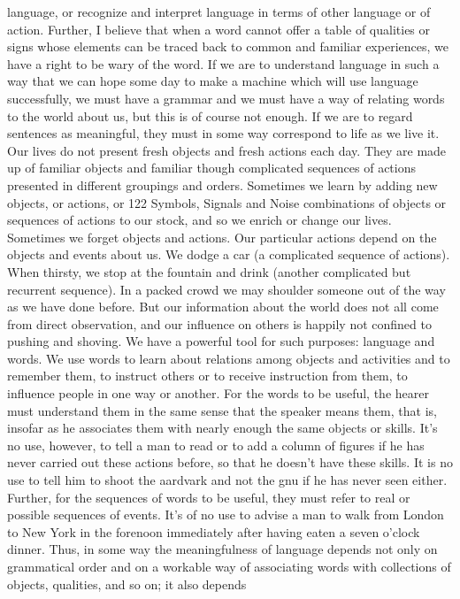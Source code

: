 {{{language, or recognize and interpret language in terms of other
language or of action. Further, I believe that when a word cannot
offer a table of qualities or signs whose elements can be traced back
to common and familiar experiences, we have a right to be wary
of the word.
If we are to understand language in such a way that we can hope
some day to make a machine which will use language successfully,
we must have a grammar and we must have a way of relating words
to the world about us, but this is of course not enough. If we are to
regard sentences as meaningful, they must in some way correspond
to life as we live it.
Our lives do not present fresh objects and fresh actions each day.
They are made up of familiar objects and familiar though complicated
sequences of actions presented in different groupings and
orders. Sometimes we learn by adding new objects, or actions, or
122
Symbols, Signals and Noise
combinations of objects or sequences of actions to our stock, and
so we enrich or change our lives. Sometimes we forget objects and
actions.
Our particular actions depend on the objects and events about
us. We dodge a car (a complicated sequence of actions). When
thirsty, we stop at the fountain and drink (another complicated but
recurrent sequence). In a packed crowd we may shoulder someone
out of the way as we have done before. But our information about
the world does not all come from direct observation, and our influence
on others is happily not confined to pushing and shoving.
We have a powerful tool for such purposes: language and words.
We use words to learn about relations among objects and activities
and to remember them, to instruct others or to receive instruction
from them, to influence people in one way or another. For the
words to be useful, the hearer must understand them in the same
sense that the speaker means them, that is, insofar as he associates
them with nearly enough the same objects or skills. It’s no use,
however, to tell a man to read or to add a column of figures if he
has never carried out these actions before, so that he doesn’t have
these skills. It is no use to tell him to shoot the aardvark and not
the gnu if he has never seen either.
Further, for the sequences of words to be useful, they must refer
to real or possible sequences of events. It’s of no use to advise a
man to walk from London to New York in the forenoon immediately
after having eaten a seven o’clock dinner.
Thus, in some way the meaningfulness of language depends not
only on grammatical order and on a workable way of associating
words with collections of objects, qualities, and so on; it also depends
}}}
